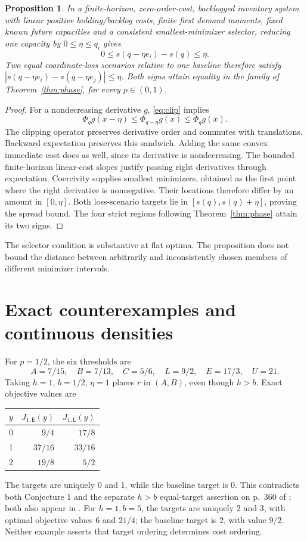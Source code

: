 \documentclass[11pt]{article}
\newtheorem{proposition}[theorem]{Proposition}
\theoremstyle{remark}\newtheorem{remark}[theorem]{Remark}
\newcommand{\Ecase}{\mathsf E}
\newcommand{\Lcase}{\mathsf L}
\begin{document}
\begin{proposition}\label{prop:sensitivity}
In a finite-horizon, zero-order-cost, backlogged inventory system with
linear positive holding/backlog costs, finite first demand moments,
fixed known future capacities and a consistent smallest-minimizer
selector, reducing one capacity by $0\le\eta\le q_i$ gives
\[
 0\le s(q-\eta e_i)-s(q)\le\eta.
\]
Two equal coordinate-loss scenarios relative to one baseline therefore
satisfy $|s(q-\eta e_i)-s(q-\eta e_j)|\le\eta$.
Both signs attain equality in the family of Theorem~\ref{thm:phase},
for every $p\in(0,1)$.
\end{proposition}
\begin{proof}
For a nondecreasing derivative $g$, \eqref{eq:clip} implies
\[
 \Phi_qg(x-\eta)\le\Phi_{q-\eta}g(x)\le\Phi_qg(x).
\]
The clipping operator preserves derivative order and commutes with
translations. Backward expectation preserves this sandwich. Adding the
same convex immediate cost does as well, since its derivative is
nondecreasing. The bounded finite-horizon linear-cost slopes justify
passing right derivatives through expectation. Coercivity supplies
smallest minimizers, obtained as the first point where the right
derivative is nonnegative. Their locations therefore differ by an
amount in $[0,\eta]$. Both loss-scenario targets lie in
$[s(q),s(q)+\eta]$, proving the spread bound. The four strict regions
following Theorem~\ref{thm:phase} attain its two signs.
\end{proof}

The selector condition is substantive at flat optima. The proposition
does not bound the distance between arbitrarily and inconsistently
chosen members of different minimizer intervals.

\section{Exact counterexamples and continuous densities}\label{sec:robust}
For $p=1/2$, the six thresholds are
\[
 A=7/15,\quad B=7/13,\quad C=5/6,\quad
 L=9/2,\quad E=17/3,\quad U=21.
\]
Taking $h=1$, $b=1/2$, $\eta=1$ places $r$ in $(A,B)$, even though
$h>b$. Exact objective values are
\begin{center}
\begin{tabular}{crr}\toprule
$y$ & $J_{1,\Ecase}(y)$ & $J_{1,\Lcase}(y)$\\\midrule
0 & $9/4$ & $17/8$\\
1 & $37/16$ & $33/16$\\
2 & $19/8$ & $5/2$\\\bottomrule
\end{tabular}
\end{center}
The targets are uniquely 0 and 1, while the baseline target is 0.
This contradicts both Conjecture 1 and the separate $h>b$ equal-target
assertion on p.~360 of \cite{Journal}; both also appear in \cite{Thesis}.
For $h=1,b=5$, the targets are uniquely 2 and 3, with optimal objective
values $6$ and $21/4$; the baseline target is 2, with value $9/2$.
Neither example asserts that target ordering determines cost ordering.
\end{document}
